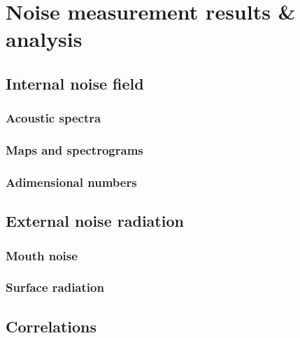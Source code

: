 
\chapter{Noise measurement results \& analysis} \label{cap:results} %

\noindent 

\section{Internal noise field}
\subsection{Acoustic spectra} 
\subsection{Maps and spectrograms}
\subsection{Adimensional numbers}

\section{External noise radiation}
\label{sec:external_results}
\subsection{Mouth noise} 
\subsection{Surface radiation}

\section{Correlations}
\label{sec:correlations}
